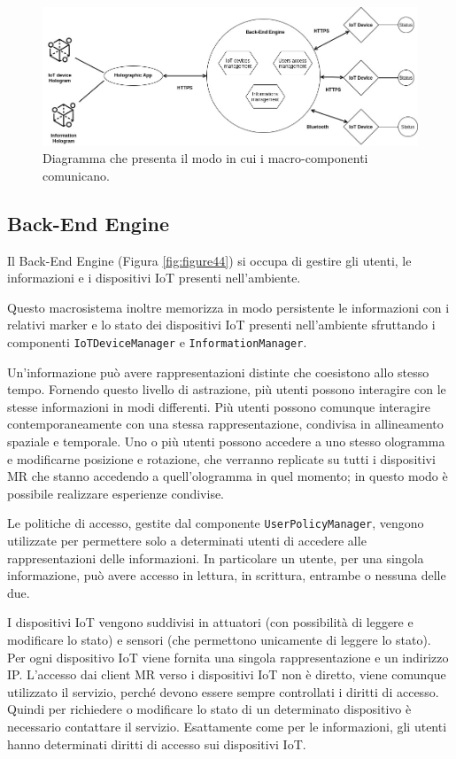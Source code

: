 \begin{figure}[H]
    \centering
    \includegraphics[width=\textwidth]{images/Diagramma-sistema.jpg}
    \caption{Diagramma che presenta il modo in cui i macro-componenti comunicano.}
    \label{fig:figure43}
\end{figure}

\subsection{Back-End Engine}
Il Back-End Engine (Figura \ref{fig:figure44}) si occupa di gestire gli utenti, le informazioni e i dispositivi IoT presenti nell'ambiente.

Questo macrosistema inoltre memorizza in modo persistente le informazioni con i relativi marker e lo stato dei dispositivi IoT presenti nell'ambiente sfruttando i componenti \texttt{IoTDeviceManager} e \texttt{InformationManager}.

Un'informazione può avere rappresentazioni distinte che coesistono allo stesso tempo. 
Fornendo questo livello di astrazione, più utenti possono interagire con le stesse informazioni in modi differenti.
Più utenti possono comunque interagire contemporaneamente con una stessa rappresentazione, condivisa in allineamento spaziale e temporale.
Uno o più utenti possono accedere a uno stesso ologramma e modificarne posizione e rotazione, che verranno replicate su tutti i dispositivi MR che stanno accedendo a quell'ologramma in quel momento; in questo modo è possibile realizzare esperienze condivise.

Le politiche di accesso, gestite dal componente \texttt{UserPolicyManager}, vengono utilizzate per permettere solo a determinati utenti di accedere alle rappresentazioni delle informazioni.
In particolare un utente, per una singola informazione, può avere accesso in lettura, in scrittura, entrambe o nessuna delle due.

I dispositivi IoT vengono suddivisi in attuatori (con possibilità di leggere e modificare lo stato) e sensori (che permettono unicamente di leggere lo stato).
Per ogni dispositivo IoT viene fornita una singola rappresentazione e un indirizzo IP.
L'accesso dai client MR verso i dispositivi IoT non è diretto, viene comunque utilizzato il servizio, perché devono essere sempre controllati i diritti di accesso.
Quindi per richiedere o modificare lo stato di un determinato dispositivo è necessario contattare il servizio.
Esattamente come per le informazioni, gli utenti hanno determinati diritti di accesso sui dispositivi IoT.

